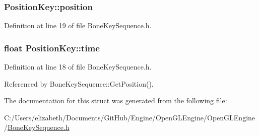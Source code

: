 \subsubsection[{\texorpdfstring{position}{position}}]{ Position\+Key\+::position}\hypertarget{struct_position_key_a6b7f3212adb099bc1b5d86513ef2fd36}{}\label{struct_position_key_a6b7f3212adb099bc1b5d86513ef2fd36}


Definition at line 19 of file Bone\+Key\+Sequence.\+h.

\subsubsection[{\texorpdfstring{time}{time}}]{\setlength{\rightskip}{0pt plus 5cm}float Position\+Key\+::time}\hypertarget{struct_position_key_ab18d1c0baf9f835e2dbd8b8663d552f4}{}\label{struct_position_key_ab18d1c0baf9f835e2dbd8b8663d552f4}


Definition at line 18 of file Bone\+Key\+Sequence.\+h.



Referenced by Bone\+Key\+Sequence\+::\+Get\+Position().



The documentation for this struct was generated from the following file\+:\begin{DoxyCompactItemize}
\item 
C\+:/\+Users/elizabeth/\+Documents/\+Git\+Hub/\+Engine/\+Open\+G\+L\+Engine/\+Open\+G\+L\+Engine/\hyperlink{_bone_key_sequence_8h}{Bone\+Key\+Sequence.\+h}\end{DoxyCompactItemize}

